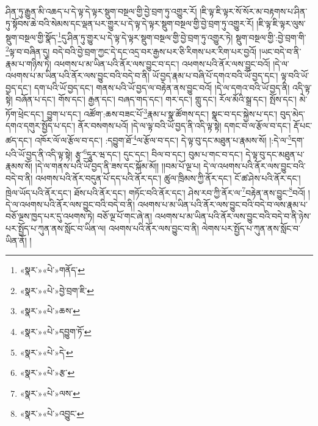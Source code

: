 ཤིན་ཏུ་རྒྱུན་མི་འཆད་པ་དེ་ལྟ་དེ་ལྟར་སྡུག་བསྔལ་གྱི་བྱེ་བྲག་ཏུ་འགྱུར་རོ། །ཇི་ལྟ་ཇི་ལྟར་སོ་སོར་མ་བརྟགས་པ་ཤིན་ཏུ་སྟོབས་ཆེ་བའི་སེམས་དང་ལྡན་པར་གྱུར་པ་དེ་ལྟ་དེ་ལྟར་སྡུག་བསྔལ་གྱི་བྱེ་བྲག་ཏུ་འགྱུར་རོ། །ཇི་ལྟ་ཇི་ལྟར་ལུས་སྡུག་བསྔལ་གྱི་སྣོད་\footnote{«སྣར་»«པེ་»གནོད་}དུ་ཤིན་ཏུ་གྱུར་པ་དེ་ལྟ་དེ་ལྟར་སྡུག་བསྔལ་གྱི་བྱེ་བྲག་ཏུ་འགྱུར་ཏེ། སྡུག་བསྔལ་གྱི་:བྱེ་བྲག་གི་\footnote{«སྣར་»«པེ་»བྱེ་བྲག་ཇི་}ལྟ་བ་བཞིན་དུ། བདེ་བའི་བྱེ་བྲག་ཀྱང་དེ་དང་འདྲ་བར་རྒྱས་པར་ཅི་རིགས་པར་རིག་པར་བྱའོ། །ཡང་བདེ་བ་ནི་རྣམ་པ་གཉིས་ཏེ། འཕགས་པ་མ་ཡིན་པའི་ནོར་ལས་བྱུང་བ་དང་། འཕགས་པའི་ནོར་ལས་བྱུང་བའོ། །དེ་ལ་འཕགས་པ་མ་ཡིན་པའི་ནོར་ལས་བྱུང་བའི་བདེ་བ་ནི། ཡོ་བྱད་རྣམ་པ་བཞི་པོ་དགའ་བའི་ཡོ་བྱད་དང་། ལྟ་བའི་ཡོ་བྱད་དང་། དག་པའི་ཡོ་བྱད་དང་། གནས་པའི་ཡོ་བྱད་ལ་བརྟེན་ནས་བྱུང་བའོ། །དེ་ལ་དགའ་བའི་ཡོ་བྱད་ནི། འདི་ལྟ་སྟེ། བཞོན་པ་དང་། གོས་དང་། རྒྱན་དང་། བཞད་གད་དང་། གར་དང་། གླུ་དང་། རོལ་མོའི་སྒྲ་དང་། སྤོས་དང་། མེ་ཏོག་ཕྲེང་དང་། བྱུག་པ་དང་། འཚོག་:ཆས་བཟང་པོ་\footnote{«སྣར་»«པེ་»ཆས་}རྣམ་པ་སྣ་ཚོགས་དང་། སྣང་བ་དང་སྐྱེས་པ་དང་། བུད་མེད་དགའ་དགུར་སྤྱོད་པ་དང་། ནོར་བསགས་པའོ། །དེ་ལ་ལྟ་བའི་ཡོ་བྱད་ནི་འདི་ལྟ་སྟེ། དགང་བ་ལ་རྩོལ་བ་དང་། རྡོ་པང་ཚད་དང་། འཁོར་ལོ་ལ་རྩོལ་བ་དང་། :དབྱུག་ཐོ་\footnote{«སྣར་»«པེ་»དབྱུག་ཏོ་}ལ་རྩོལ་བ་དང་། དེ་ལྟ་བུ་དང་མཐུན་པ་རྣམས་སོ། །:དེ་ལ་\footnote{«སྣར་»«པེ་»དེ་}དག་པའི་ཡོ་བྱད་ནི་འདི་ལྟ་སྟེ། རྩྭ་\footnote{«སྣར་»«པེ་»རྩ་}དཱུར་ཝ་དང་། དུང་དང་། བིལ་བ་དང་། བུམ་པ་གང་བ་དང་། དེ་ལྟ་བུ་དང་མཐུན་པ་རྣམས་སོ། །དེ་ལ་གནས་པའི་ཡོ་བྱད་ནི་ཟས་དང་སྐོམ་མོ།། །།བམ་པོ་ལྔ་པ། དེ་ལ་འཕགས་པའི་ནོར་ལས་བྱུང་བའི་བདེ་བ་ནི། འཕགས་པའི་ནོར་བདུན་པོ་དད་པའི་ནོར་དང་། ཚུལ་ཁྲིམས་ཀྱི་ནོར་དང་། ངོ་ཚ་ཤེས་པའི་ནོར་དང་། ཁྲེལ་ཡོད་པའི་ནོར་དང་། ཐོས་པའི་ནོར་དང་། གཏོང་བའི་ནོར་དང་། ཤེས་རབ་ཀྱི་ནོར་ལ་\footnote{«སྣར་»«པེ་»ལས་}བརྟེན་ནས་བྱུང་\footnote{«སྣར་»«པེ་»འབྱུང་}བའོ། །དེ་ལ་འཕགས་པའི་ནོར་ལས་བྱུང་བའི་བདེ་བ་ནི། འཕགས་པ་མ་ཡིན་པའི་ནོར་ལས་བྱུང་བའི་བདེ་བ་ལས་རྣམ་པ་བཅོ་ལྔས་ཁྱད་པར་དུ་འཕགས་ཏེ། བཅོ་ལྔ་པོ་གང་ཞེ་ན། འཕགས་པ་མ་ཡིན་པའི་ནོར་ལས་བྱུང་བའི་བདེ་བ་ནི་ཉེས་པར་སྤྱོད་པ་ཀུན་ནས་སློང་བ་ཡིན་ལ། འཕགས་པའི་ནོར་ལས་བྱུང་བ་ནི། ལེགས་པར་སྤྱོད་པ་ཀུན་ནས་སློང་བ་ཡིན་ནོ། །
